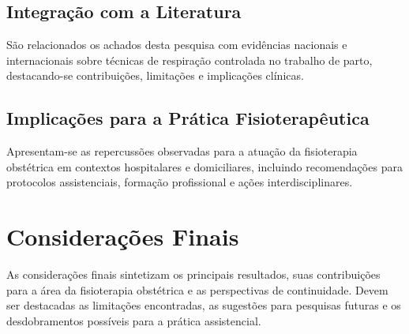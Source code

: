 \documentclass[openright]{normas-utf-tex}
\begin{document}
\section{Integração com a Literatura}
\label{sec:integracao-literatura}

São relacionados os achados desta pesquisa com evidências nacionais e internacionais sobre técnicas de respiração controlada no trabalho de parto, destacando-se contribuições, limitações e implicações clínicas.

\section{Implicações para a Prática Fisioterapêutica}
\label{sec:implicacoes-pratica}

Apresentam-se as repercussões observadas para a atuação da fisioterapia obstétrica em contextos hospitalares e domiciliares, incluindo recomendações para protocolos assistenciais, formação profissional e ações interdisciplinares.

\chapter{Considerações Finais}
\label{chap:consideracoes-finais}

As considerações finais sintetizam os principais resultados, suas contribuições para a área da fisioterapia obstétrica e as perspectivas de continuidade. Devem ser destacadas as limitações encontradas, as sugestões para pesquisas futuras e os desdobramentos possíveis para a prática assistencial.

\clearpage %
\label{bibstart}


\label{bibend}
\end{document}
